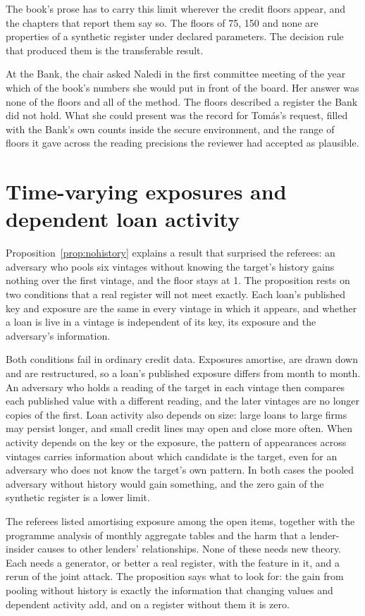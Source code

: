 The book's prose has to carry this limit wherever the credit floors appear, and the
chapters that report them say so. The floors of 75, 150 and none are properties of a
synthetic register under declared parameters. The decision rule that produced them is
the transferable result.

At the Bank, the chair asked Naledi in the first committee meeting of the year which
of the book's numbers she would put in front of the board. Her answer was none of the
floors and all of the method. The floors described a register the Bank did not hold.
What she could present was the record for Tomás's request, filled with the Bank's own
counts inside the secure environment, and the range of floors it gave across the
reading precisions the reviewer had accepted as plausible.

\section{Time-varying exposures and dependent loan activity}

Proposition~\ref{prop:nohistory} explains a result that surprised the referees: an
adversary who pools six vintages without knowing the target's history gains nothing
over the first vintage, and the floor stays at 1. The proposition rests on two
conditions that a real register will not meet exactly. Each loan's published key and
exposure are the same in every vintage in which it appears, and whether a loan is
live in a vintage is independent of its key, its exposure and the adversary's
information.

Both conditions fail in ordinary credit data. Exposures amortise, are drawn down and
are restructured, so a loan's published exposure differs from month to month. An
adversary who holds a reading of the target in each vintage then compares each
published value with a different reading, and the later vintages are no longer copies
of the first. Loan activity also depends on size: large loans to large firms may
persist longer, and small credit lines may open and close more often. When activity
depends on the key or the exposure, the pattern of appearances across vintages carries
information about which candidate is the target, even for an adversary who does not
know the target's own pattern. In both cases the pooled adversary without history
would gain something, and the zero gain of the synthetic register is a lower limit.

The referees listed amortising exposure among the open items, together with the
programme analysis of monthly aggregate tables and the harm that a lender-insider
causes to other lenders' relationships. %
None of these needs new theory. Each needs a generator, or better a real register,
with the feature in it, and a rerun of the joint attack. The proposition says what to
look for: the gain from pooling without history is exactly the information that
changing values and dependent activity add, and on a register without them it is zero.

